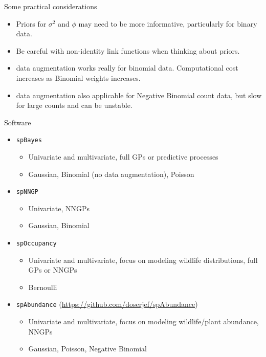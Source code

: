 \begin{frame}{Some practical considerations}
     \begin{itemize}
          \item Priors for $\sigma^2$ and $\phi$ may need to be more informative, particularly for binary data. 
	  \item Be careful with non-identity link functions when thinking about priors.
	  \item \pg data augmentation works really for binomial data. Computational cost increases as Binomial weights increases.
	  \item \pg data augmentation also applicable for Negative Binomial count data, but slow for large counts and can be unstable.
     \end{itemize}

\end{frame}
 
\begin{frame}{Software}
     \begin{itemize}
          \item \texttt{spBayes}
               \begin{itemize}
		    \item Univariate and multivariate, full GPs or predictive processes 
                    \item Gaussian, Binomial (no \pg data augmentation), Poisson
	       \end{itemize}
       \item \texttt{spNNGP} 
	       \begin{itemize}
                    \item Univariate, NNGPs
		    \item Gaussian, Binomial
	       \end{itemize}
       \item \texttt{spOccupancy}
	       \begin{itemize}
                    \item Univariate and multivariate, focus on modeling wildlife distributions, full GPs or NNGPs
		    \item Bernoulli
	       \end{itemize}
       \item \texttt{spAbundance}  (\url{https://github.com/doserjef/spAbundance})
	       \begin{itemize}
                    \item Univariate and multivariate, focus on modeling wildlife/plant abundance, NNGPs
		    \item Gaussian, Poisson, Negative Binomial
	       \end{itemize}
     \end{itemize}
\end{frame}
 

